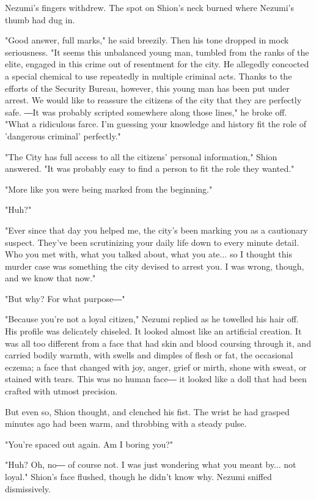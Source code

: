 Nezumi's fingers withdrew. The spot on Shion's neck burned where
Nezumi's thumb had dug in.

"Good answer, full marks," he said breezily. Then his tone dropped in
mock seriousness. "It seems this unbalanced young man, tumbled from the
ranks of the elite, engaged in this crime out of resentment for the
city. He allegedly concocted a special chemical to use repeatedly in
multiple criminal acts. Thanks to the efforts of the Security Bureau,
however, this young man has been put under arrest. We would like to
reassure the citizens of the city that they are perfectly safe. ―It was
probably scripted somewhere along those lines," he broke off. "What a
ridiculous farce. I'm guessing your knowledge and history fit the role
of 'dangerous criminal' perfectly."

"The City has full access to all the citizens' personal information,"
Shion answered. "It was probably easy to find a person to fit the role
they wanted."

"More like you were being marked from the beginning."

"Huh?"

"Ever since that day you helped me, the city's been marking you as a
cautionary suspect. They've been scrutinizing your daily life down to
every minute detail. Who you met with, what you talked about, what you
ate... so I thought this murder case was something the city devised to
arrest you. I was wrong, though, and we know that now."

"But why? For what purpose―"

"Because you're not a loyal citizen," Nezumi replied as he towelled his
hair off. His profile was delicately chiseled. It looked almost like an
artificial creation. It was all too different from a face that had skin
and blood coursing through it, and carried bodily warmth, with swells
and dimples of flesh or fat, the occasional eczema; a face that changed
with joy, anger, grief or mirth, shone with sweat, or stained with
tears. This was no human face― it looked like a doll that had been
crafted with utmost precision.

But even so, Shion thought, and clenched his fist. The wrist he had
grasped minutes ago had been warm, and throbbing with a steady pulse.

"You're spaced out again. Am I boring you?"

"Huh? Oh, no― of course not. I was just wondering what you meant by...
not loyal." Shion's face flushed, though he didn't know why. Nezumi
sniffed dismissively.

